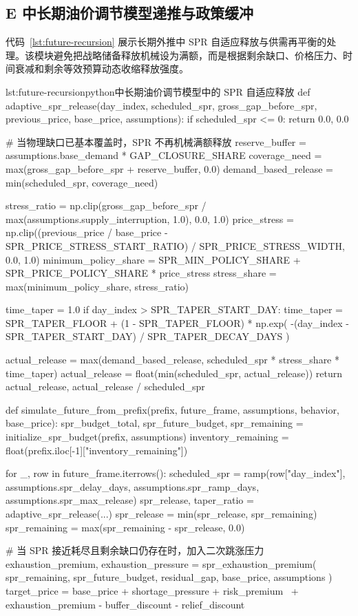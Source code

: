 \clearpage

\subsection*{E 中长期油价调节模型递推与政策缓冲}

代码~\ref{lst:future-recursion} 展示长期外推中 SPR 自适应释放与供需再平衡的处理。该模块避免把战略储备释放机械设为满额，而是根据剩余缺口、价格压力、时间衰减和剩余等效预算动态收缩释放强度。

\begin{paperlisting}{lst:future-recursion}{python}{中长期油价调节模型中的 SPR 自适应释放}
def adaptive_spr_release(day_index, scheduled_spr, gross_gap_before_spr,
                         previous_price, base_price, assumptions):
    if scheduled_spr <= 0:
        return 0.0, 0.0

    # 当物理缺口已基本覆盖时，SPR 不再机械满额释放
    reserve_buffer = assumptions.base_demand * GAP_CLOSURE_SHARE
    coverage_need = max(gross_gap_before_spr + reserve_buffer, 0.0)
    demand_based_release = min(scheduled_spr, coverage_need)

    stress_ratio = np.clip(gross_gap_before_spr / max(assumptions.supply_interruption, 1.0),
                           0.0, 1.0)
    price_stress = np.clip((previous_price / base_price - SPR_PRICE_STRESS_START_RATIO)
                           / SPR_PRICE_STRESS_WIDTH, 0.0, 1.0)
    minimum_policy_share = SPR_MIN_POLICY_SHARE + SPR_PRICE_POLICY_SHARE * price_stress
    stress_share = max(minimum_policy_share, stress_ratio)

    time_taper = 1.0
    if day_index > SPR_TAPER_START_DAY:
        time_taper = SPR_TAPER_FLOOR + (1 - SPR_TAPER_FLOOR) * np.exp(
            -(day_index - SPR_TAPER_START_DAY) / SPR_TAPER_DECAY_DAYS
        )

    actual_release = max(demand_based_release, scheduled_spr * stress_share * time_taper)
    actual_release = float(min(scheduled_spr, actual_release))
    return actual_release, actual_release / scheduled_spr

def simulate_future_from_prefix(prefix, future_frame, assumptions, behavior, base_price):
    spr_budget_total, spr_future_budget, spr_remaining = initialize_spr_budget(prefix, assumptions)
    inventory_remaining = float(prefix.iloc[-1]["inventory_remaining"])

    for _, row in future_frame.iterrows():
        scheduled_spr = ramp(row["day_index"], assumptions.spr_delay_days,
                             assumptions.spr_ramp_days, assumptions.spr_max_release)
        spr_release, taper_ratio = adaptive_spr_release(...)
        spr_release = min(spr_release, spr_remaining)
        spr_remaining = max(spr_remaining - spr_release, 0.0)

        # 当 SPR 接近耗尽且剩余缺口仍存在时，加入二次跳涨压力
        exhaustion_premium, exhaustion_pressure = spr_exhaustion_premium(
            spr_remaining, spr_future_budget, residual_gap, base_price, assumptions
        )
        target_price = base_price + shortage_pressure + risk_premium \
            + exhaustion_premium - buffer_discount - relief_discount
\end{paperlisting}

